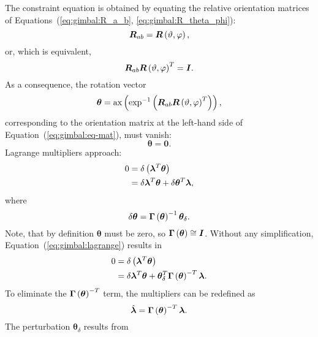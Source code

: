 \documentclass[10pt,fleqn,subeqn]{report}
\newcommand{\T}[1]{\bm{#1}}
\begin{document}
\noindent
The constraint equation is obtained by equating the relative orientation
matrices of Equations~(\ref{eq:gimbal:R_a_b}, \ref{eq:gimbal:R_theta_phi}):
\begin{equation}
	\T{R}_{ab} = \T{R}\plbr{\vartheta, \varphi} ,
\end{equation}
or, which is equivalent,
\begin{equation}
	\T{R}_{ab} \T{R}\plbr{\vartheta, \varphi}^T = \T{I} .
	\label{eq:gimbal:eq-mat}
\end{equation}
As a consequence, the rotation vector
\begin{equation}
	\T{\theta} = \llk{ax}\plbr{\llk{exp}^{-1}\plbr{
		\T{R}_{ab} \T{R}\plbr{\vartheta, \varphi}^T
	}} ,
\end{equation}
corresponding to the orientation matrix at the left-hand side
of Equation~(\ref{eq:gimbal:eq-mat}),
must vanish:
\begin{equation}
	\T{\theta} = \T{0} .
	\label{eq:GIMBAL-CONSTRAINT}
\end{equation}
Lagrange multipliers approach:
\begin{align}
	0 &= \delta\plbr{\T{\lambda}^T \T{\theta}} \nonumber \\
	&= \delta\T{\lambda}^T \T{\theta} + \delta\T{\theta}^T \T{\lambda} ,
	\label{eq:gimbal:lagrange}
\end{align}
where
\begin{equation}
	\delta\T{\theta}
	= \T{\Gamma}\plbr{\T{\theta}}^{-1} \T{\theta}_{\delta} .
\end{equation}
Note, that by definition $\T{\theta}$ must be zero,
so $\T{\Gamma}\plbr{\T{\theta}}\cong\T{I}$.
Without any simplification, Equation~(\ref{eq:gimbal:lagrange}) results in
\begin{subequations}
\begin{align}
	0 &= \delta\plbr{\T{\lambda}^T \T{\theta}} \\
	&= \delta\T{\lambda}^T \T{\theta}
	+ \T{\theta}_{\delta}^T \T{\Gamma}\plbr{\T{\theta}}^{-T}\T{\lambda} .
\end{align}
\end{subequations}
To eliminate the $\T{\Gamma}\plbr{\T{\theta}}^{-T}$ term,
the multipliers can be redefined as 
\begin{equation}
	\hat{\T{\lambda}} = \T{\Gamma}\plbr{\T{\theta}}^{-T} \T{\lambda} .
\end{equation}
The perturbation $\T{\theta}_{\delta}$ results from
\end{document}
